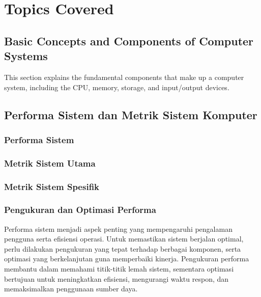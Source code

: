 \documentclass[12pt]{article}
\begin{document}
\section{Topics Covered}

\subsection{Basic Concepts and Components of Computer Systems}
This section explains the fundamental components that make up a computer system, including the CPU, memory, storage, and input/output devices.

\subsection{Performa Sistem dan Metrik Sistem Komputer}

\subsubsection{Performa Sistem}

\subsubsection{Metrik Sistem Utama}

\subsubsection{Metrik Sistem Spesifik}

\subsubsection{Pengukuran dan Optimasi Performa}

\par Performa sistem menjadi aspek penting yang mempengaruhi pengalaman pengguna serta efisiensi operasi. Untuk memastikan sistem berjalan optimal, perlu dilakukan pengukuran yang tepat terhadap berbagai komponen, serta optimasi yang berkelanjutan guna memperbaiki kinerja. Pengukuran performa membantu dalam memahami titik-titik lemah sistem, sementara optimasi bertujuan untuk meningkatkan efisiensi, mengurangi waktu respon, dan memaksimalkan penggunaan sumber daya.
\end{document}
